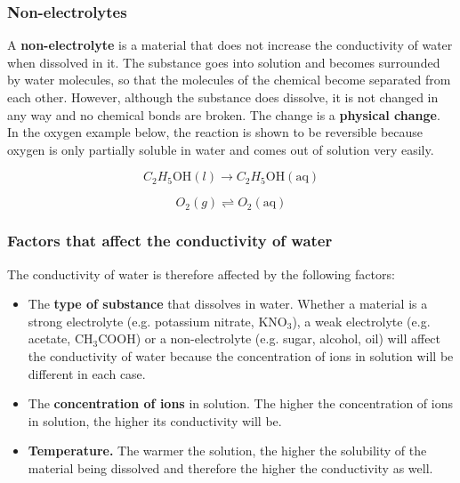             \subsubsection{ Non-electrolytes}
            \nopagebreak
        \label{m38720*id339146}A \textbf{non-electrolyte} is a material that does not increase the conductivity of water when dissolved in it. The substance goes into solution and becomes surrounded by water molecules, so that the molecules of the chemical become separated from each other. However, although the substance does dissolve, it is not changed in any way and no chemical bonds are broken. The change is a \textbf{physical change}. In the oxygen example below, the reaction is shown to be reversible because oxygen is only partially soluble in water and comes out of solution very easily.\par 
        \label{m38720*id339165}\nopagebreak\noindent{}
          
    \begin{equation}
    {C}_{2}{H}_{5}\mathrm{OH}\left(l\right)\to {C}_{2}{H}_{5}\mathrm{OH}\left(\mathrm{aq}\right)\tag{17.7}
      \end{equation}
        \label{m38720*id339233}\nopagebreak\noindent{}
          
    \begin{equation}
    {O}_{2}\left(g\right)⇌{O}_{2}\left(\mathrm{aq}\right)\tag{17.8}
      \end{equation}
      \label{m38720*uid56}
            \subsubsection{ Factors that affect the conductivity of water}
            \nopagebreak
            \label{m38720*id339287}The conductivity of water is therefore affected by the following factors:\par 
        \label{m38720*id339291}\begin{itemize}[noitemsep]
            \label{m38720*uid57}\item The \textbf{type of substance} that dissolves in water.
Whether a material is a strong electrolyte (e.g. potassium nitrate, ${\mathrm{KNO}}_{3}$), a weak electrolyte (e.g. acetate, ${\mathrm{CH}}_{3}\mathrm{COOH}$) or a non-electrolyte (e.g. sugar, alcohol, oil) will affect the conductivity of water because the concentration of ions in solution will be different in each case.
\label{m38720*uid58}\item The \textbf{concentration of ions} in solution.
The higher the concentration of ions in solution, the higher its conductivity will be.
\label{m38720*uid59}\item \textbf{Temperature.}
The warmer the solution, the higher the solubility of the material being dissolved and therefore the higher the conductivity as well.
\end{itemize}
\label{m38720*secfhsst!!!underscore!!!id739}
